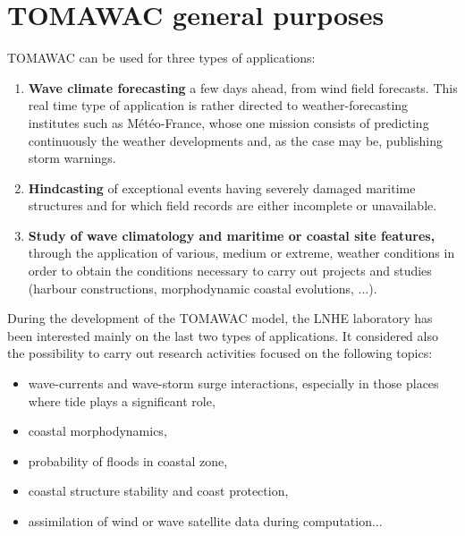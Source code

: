 \section{ TOMAWAC general purposes}

 TOMAWAC can be used for three types of applications:

 \begin{enumerate}
\item \textbf{Wave climate forecasting} a few days ahead, from wind field forecasts. This real time type of application is rather directed to weather-forecasting institutes such as Météo-France, whose one mission consists of predicting continuously the weather developments and, as the case may be, publishing storm warnings.

 \item \textbf{Hindcasting }of exceptional events having severely damaged maritime structures and for which field records are either incomplete or unavailable.

 \item \textbf{Study of wave climatology and maritime or coastal site features, }through the application of various, medium or extreme, weather conditions in order to obtain the conditions necessary to carry out projects and studies (harbour constructions, morphodynamic coastal evolutions, ...).
\end{enumerate}

During the development of the TOMAWAC model, the LNHE laboratory has been interested mainly on the last two types of applications. It considered also the possibility to carry out research activities focused on the following topics:

 \begin{itemize}
 \item wave-currents and wave-storm surge interactions, especially in those places where tide plays a significant role,

 \item coastal morphodynamics,

 \item probability of floods in coastal zone,

 \item coastal structure stability and coast protection,

 \item assimilation of wind or wave satellite data during computation...
\end{itemize}


